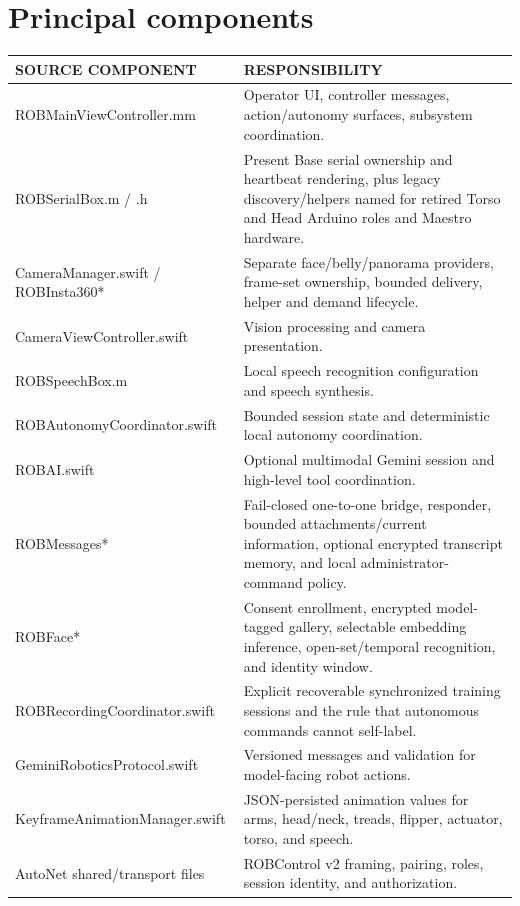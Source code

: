 \documentclass[10pt,openany]{book}
\begin{document}
\section{Principal components}

\begin{tabularx}{\textwidth}{>{\ttfamily\scriptsize}p{2.35in} X}
\toprule
SOURCE COMPONENT & RESPONSIBILITY\\
\midrule
ROBMainViewController.mm & Operator UI, controller messages, action/autonomy surfaces, subsystem coordination.\\
ROBSerialBox.m / .h & Present Base serial ownership and heartbeat rendering, plus legacy discovery/helpers named for retired Torso and Head Arduino roles and Maestro hardware.\\
CameraManager.swift / ROBInsta360* & Separate face/belly/panorama providers, frame-set ownership, bounded delivery, helper and demand lifecycle.\\
CameraViewController.swift & Vision processing and camera presentation.\\
ROBSpeechBox.m & Local speech recognition configuration and speech synthesis.\\
ROBAutonomyCoordinator.swift & Bounded session state and deterministic local autonomy coordination.\\
ROBAI.swift & Optional multimodal Gemini session and high-level tool coordination.\\
ROBMessages* & Fail-closed one-to-one bridge, responder, bounded attachments/current information, optional encrypted transcript memory, and local administrator-command policy.\\
ROBFace* & Consent enrollment, encrypted model-tagged gallery, selectable embedding inference, open-set/temporal recognition, and identity window.\\
ROBRecordingCoordinator.swift & Explicit recoverable synchronized training sessions and the rule that autonomous commands cannot self-label.\\
GeminiRoboticsProtocol.swift & Versioned messages and validation for model-facing robot actions.\\
KeyframeAnimationManager.swift & JSON-persisted animation values for arms, head/neck, treads, flipper, actuator, torso, and speech.\\
AutoNet shared/transport files & ROBControl v2 framing, pairing, roles, session identity, and authorization.\\
\bottomrule
\end{tabularx}
\end{document}
